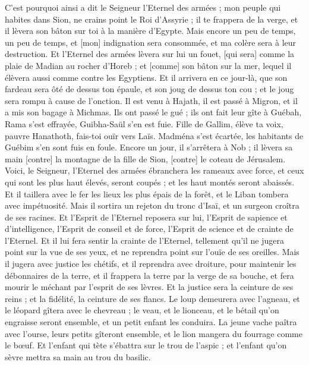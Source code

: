 \begin{multicols}{2}
C'est pourquoi ainsi a dit le Seigneur l'Eternel des armées ; mon peuple qui habites dans Sion, ne crains point le Roi d'Assyrie ; il te frappera de la verge, et il lèvera son bâton sur toi à la manière d'Egypte.
Mais encore un peu de temps, un peu de temps, et [mon] indignation sera consommée, et ma colère sera à leur destruction.
Et l'Eternel des armées lèvera sur lui un fouet, [qui sera] comme la plaie de Madian au rocher d'Horeb ; et [comme] son bâton sur la mer, lequel il élèvera aussi comme contre les Egyptiens.
Et il arrivera en ce jour-là, que son fardeau sera ôté de dessus ton épaule, et son joug de dessus ton cou ; et le joug sera rompu à cause de l'onction.
Il est venu à Hajath, il est passé à Migron, et il a mis son bagage à Michmas.
Ils ont passé le gué ; ils ont fait leur gîte à Guébah, Rama s'est effrayée, Guibha-Saül s'en est fuie.
Fille de Gallim, élève ta voix, pauvre Hanathoth, fais-toi ouïr vers Laïs.
Madména s'est écartée, les habitants de Guébim s'en sont fuis en foule.
Encore un jour, il s'arrêtera à Nob ; il lèvera sa main [contre] la montagne de la fille de Sion, [contre] le coteau de Jérusalem.
Voici, le Seigneur, l'Eternel des armées ébranchera les rameaux avec force, et ceux qui sont les plus haut élevés, seront coupés ; et les haut montés seront abaissés.
Et il taillera avec le fer les lieux les plus épais de la forêt, et le Liban tombera avec impétuosité.
\VerseOne{}Mais il sortira un rejeton du tronc d'Isaï, et un surgeon croîtra de ses racines.
Et l'Esprit de l'Eternel reposera sur lui, l'Esprit de sapience et d'intelligence, l'Esprit de conseil et de force, l'Esprit de science et de crainte de l'Eternel.
Et il lui fera sentir la crainte de l'Eternel, tellement qu'il ne jugera point sur la vue de ses yeux, et ne reprendra point sur l'ouïe de ses oreilles.
Mais il jugera avec justice les chétifs, et il reprendra avec droiture, pour maintenir les débonnaires de la terre, et il frappera la terre par la verge de sa bouche, et fera mourir le méchant par l'esprit de ses lèvres.
Et la justice sera la ceinture de ses reins ; et la fidélité, la ceinture de ses flancs.
Le loup demeurera avec l'agneau, et le léopard gîtera avec le chevreau ; le veau, et le lionceau, et le bétail qu'on engraisse seront ensemble, et un petit enfant les conduira.
La jeune vache paîtra avec l'ourse, leurs petits gîteront ensemble, et le lion mangera du fourrage comme le bœuf.
Et l'enfant qui tète s'ébattra sur le trou de l'aspic ; et l'enfant qu'on sèvre mettra sa main au trou du basilic.

\end{multicols}
